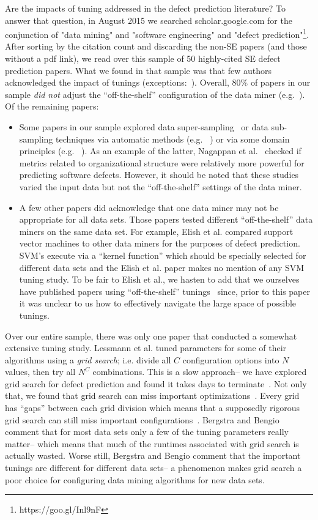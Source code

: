 \documentclass{sig-alternative}
\newcommand{\bi}{\begin{itemize}[leftmargin=0.4cm]}
\newcommand{\ei}{\end{itemize}}
\begin{document}
Are the impacts of tuning addressed in the defect prediction literature?
To answer that question,  in August 2015 we searched scholar.google.com for the conjunction of  "data mining" and "software engineering" and  "defect prediction"\footnote{https://goo.gl/Inl9nF}.
After sorting by the citation count and discarding the non-SE papers (and those without a pdf link), we read over this sample
of  50 highly-cited SE defect prediction papers. 
What we found in that sample was that few authors
acknowledged the impact of tunings (exceptions:~\cite{Gao:2011,lessmann2008benchmarking}).
Overall,  80\% of papers in our sample {\em did not} adjust
the ``off-the-shelf'' configuration of the data miner (e.g.~\cite{me07b,Moser:2008,Elish2008649}). Of the remaining papers:
\bi
\item
Some papers in our sample  explored   data super-sampling~\cite{4271036} or data sub-sampling techniques via  automatic methods (e.g. ~\cite{Gao:2011,me07b,4271036,Kim:2011}) 
or via some domain principles (e.g. ~\cite{Moser:2008,Nagappan:2008,Hassan:2009}).
As an example of the latter, Nagappan et al.~\cite{Nagappan:2008} checked if metrics related to organizational structure were relatively more powerful for predicting software defects. 
However, it should be noted that  these studies varied the input data but
not the   ``off-the-shelf''   settings of the data miner.
\item
A few other papers did acknowledge that one data miner may not be appropriate
for all data sets.  Those papers tested  different  
``off-the-shelf'' data miners on the same data set.
For example, Elish et al.\cite{Elish2008649}  compared support vector
machines to other data miners for the purposes of defect prediction. SVM's execute via a ``kernel function'' which should be specially selected for different data sets and
the Elish et al. paper  makes no mention of any SVM tuning study.  
To be fair to Elish et al., we hasten to add that we
ourselves have  published
papers using ``off-the-shelf'' tunings~\cite{me07b} since,
prior to this paper it was unclear to us how to effectively
navigate the large space of possible tunings.
\ei
Over our entire sample, there was only  one paper that conducted a somewhat extensive tuning study.
Lessmann et al.\cite{lessmann2008benchmarking} tuned parameters for some of their algorithms using  a {\em grid search}; i.e. divide all $C$ configuration
options into $N$ values, then try all   $N^C$ combinations.
This is a slow approach-- we have explored grid search for 
defect prediction and found it takes days to terminate~\cite{me07b}.
Not only that, we found that grid search can miss
important optimizations~\cite{baker07}.
Every grid has ``gaps'' between each grid division which means
that a supposedly rigorous grid search can still miss
important configurations~\cite{Bergstra2012}. 
Bergstra and Bengio~\cite{Bergstra2012} comment that for most data sets only a few of the tuning parameters really matter-- which means that
much of the runtimes associated with grid search is actually wasted.
Worse still, Bergstra and Bengio  comment that 
the 
important tunings are   different   for different
data sets-- a 
 phenomenon makes grid search a poor choice for configuring data mining
 algorithms for new data sets. 
 
\end{document}

